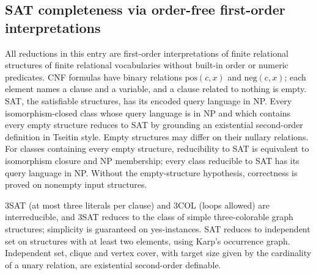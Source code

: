 \begin{result}
\subsection{SAT completeness via order-free first-order interpretations}
All reductions in this entry are first-order interpretations of finite relational
structures of finite relational vocabularies without built-in order or numeric
predicates. CNF formulas have binary
relations $\mathrm{pos}(c,x)$ and $\mathrm{neg}(c,x)$; each element names a clause and
a variable, and a clause related to nothing is empty. SAT, the satisfiable structures,
has its encoded query language in NP. Every isomorphism-closed class whose query
language is in NP and which contains every empty structure reduces to SAT by grounding
an existential second-order definition in Tseitin style. Empty structures may differ
on their nullary relations. For classes containing every
empty structure, reducibility to SAT is equivalent to isomorphism closure and NP
membership; every class reducible to SAT has its query language in NP. Without the
empty-structure hypothesis, correctness is proved on nonempty input structures.
\citep[Chapter 7]{Immerman1999}\citep{Fagin1974}

3SAT (at most three literals per clause) and 3COL (loops allowed) are interreducible,
and 3SAT reduces to the class of simple three-colorable graph structures;
simplicity is guaranteed on yes-instances. SAT reduces to independent
set on structures with at least two elements, using Karp's occurrence graph.
Independent set, clique and vertex cover, with target size given by the cardinality
of a unary relation, are existential second-order definable.
\citep{Karp1972,GareyJohnson1979}


\end{result}
